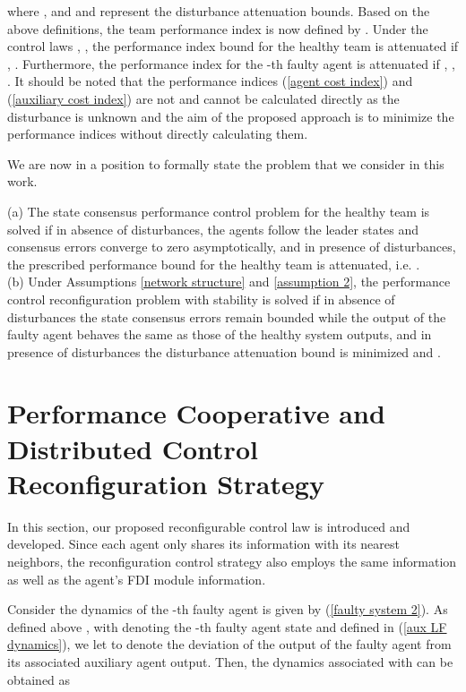 \documentclass[12pt,draftcls,onecolumn]{IEEEtran}
\begin{document}
 where 
, 
 and  and  represent the disturbance attenuation bounds. Based on the above definitions, the team performance index is now defined by . Under the control laws , , the  performance index bound for the healthy team is attenuated if , .  Furthermore, the  performance index for the -th faulty agent is attenuated if , , . {It should be noted that
 the performance indices (\ref{agent cost index}) and (\ref{auxiliary cost index}) are not and cannot be calculated directly as the disturbance is unknown and the aim of the proposed approach is to minimize the performance indices without directly calculating them.}
 
We are now in a position to formally state  the problem that we consider in this work.
 \begin{definitions}\label{def. 1}
 (a) The   state consensus  performance control problem for the  healthy  team is solved if in  absence of  disturbances, the agents   follow the leader states and consensus errors converge to zero asymptotically, and in  presence of disturbances, the prescribed   performance bound for the healthy team is attenuated, i.e. .\\ 
 (b) Under Assumptions \ref{network structure} and \ref{assumption 2}, the  performance  control reconfiguration problem with stability is solved if in absence of  disturbances the state consensus errors remain bounded  
 while the output of the faulty agent behaves the same as those of the healthy system outputs, and in presence of disturbances the disturbance attenuation bound is minimized and .
 \end{definitions}
\section{ Performance Cooperative and Distributed  Control Reconfiguration Strategy}\label{proposed methodology}
In this section, our proposed  reconfigurable control law is introduced and developed.  Since each agent only shares its information with its nearest neighbors,  the reconfiguration control strategy also employs the same information as well as the agent's FDI module information. \par
Consider the dynamics of the -th faulty agent is given by (\ref{faulty system 2}). As defined above  ,  with  denoting the -th faulty agent  state and   defined in (\ref{aux LF dynamics}),  we let  to  denote the deviation of the output of the faulty agent from its associated auxiliary agent output. Then, the dynamics associated with  can be obtained as
\end{document}

